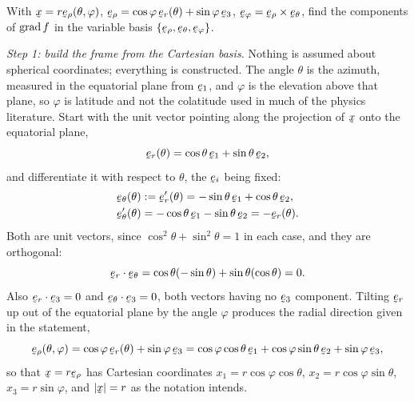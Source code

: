 \begin{problem}
With $\bx=r\berho(\theta,\varphi)$, $\berho=\cos\varphi\,\ber(\theta)
+\sin\varphi\,\be_3$, $\beph=\berho\times\beth$, find the components of
$\operatorname{grad} f$ in the variable basis $\{\berho,\beth,\beph\}$.
\end{problem}
\begin{solution}
\emph{Step 1: build the frame from the Cartesian basis.}
Nothing is assumed about spherical coordinates; everything is constructed.
The angle $\theta$ is the azimuth, measured in the equatorial plane from
$\be_{1}$, and $\varphi$ is the elevation above that plane, so $\varphi$ is
latitude and not the colatitude used in much of the physics literature.
Start with the unit vector pointing along the projection of $\bx$ onto the
equatorial plane,
\[
   \ber(\theta)=\cos\theta\,\be_{1}+\sin\theta\,\be_{2},
\]
and differentiate it with respect to $\theta$, the $\be_{i}$ being fixed:
\[
\begin{aligned}
   \beth(\theta)&:=\ber'(\theta)=-\sin\theta\,\be_{1}+\cos\theta\,\be_{2},\\
   \beth'(\theta)&=-\cos\theta\,\be_{1}-\sin\theta\,\be_{2}=-\ber(\theta).
\end{aligned}
\]
Both are unit vectors, since
$\cos^{2}\theta+\sin^{2}\theta=1$ in each case, and they are orthogonal:
\[
   \ip\ber\beth=\cos\theta(-\sin\theta)+\sin\theta(\cos\theta)=0 .
\]
Also $\ip\ber{\be_{3}}=0$ and $\ip\beth{\be_{3}}=0$, both vectors having no
$\be_{3}$ component. Tilting $\ber$ up out of the equatorial plane by the
angle $\varphi$ produces the radial direction given in the statement,
\[
   \berho(\theta,\varphi)=\cos\varphi\,\ber(\theta)+\sin\varphi\,\be_{3}
   =\cos\varphi\cos\theta\,\be_{1}+\cos\varphi\sin\theta\,\be_{2}
    +\sin\varphi\,\be_{3},
\]
so that $\bx=r\berho$ has Cartesian coordinates
$x_{1}=r\cos\varphi\cos\theta$, $x_{2}=r\cos\varphi\sin\theta$,
$x_{3}=r\sin\varphi$, and $|\bx|=r$ as the notation intends.


\end{solution}
